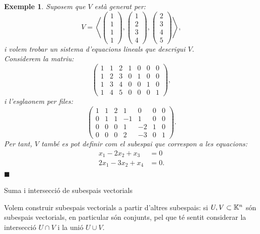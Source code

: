 \documentclass[
  11pt,
]{book}
\makeatletter
\numberwithin{dummy}{section}
\theoremstyle{maincolornumbox}
\theoremstyle{blacknumex}
\newtheorem{exampleT}{Exemple}[chapter]
\theoremstyle{blacknumbox}
\theoremstyle{maincolornum}
\newenvironment{example}{\begin{exampleT}}{\hfill{\tiny\ensuremath{\blacksquare}}\end{exampleT}}
\renewcommand{\section}{\@startsection{section}{1}{\z@}
{-4ex \@plus -1ex \@minus -.4ex}
{1ex \@plus.2ex }
{\normalfont\large\sffamily\bfseries}}
\newlength\esp
\makeatother
\begin{document}
\begin{example}
Suposem que \(V\) està generat per: \[V=\left\langle
    \begin{pmatrix}1 \\ 1 \\ 1 \\ 1  \end{pmatrix},
    \begin{pmatrix}1 \\ 2 \\ 3 \\ 4  \end{pmatrix},
    \begin{pmatrix}2 \\ 3 \\ 4 \\ 5  \end{pmatrix}\right\rangle,\] i
volem trobar un sistema d'equacions lineals que descrigui \(V\).\\
Considerem la matriu: \[\left(
    \begin{array}{ccc|cccc}
    1 & 1 & 2 & 1 & 0 & 0 & 0\\
    1 & 2 & 3 & 0 & 1 & 0 & 0\\
    1 & 3 & 4 & 0 & 0 & 1 & 0\\
    1 & 4 & 5 & 0 & 0 & 0 & 1
    \end{array}
    \right),\] i l'esglaonem per files: \[\left(
    \begin{array}{ccc|rrcc}
    1 & 1 & 2 & 1 & 0 & 0 & 0\\
    0 & 1 & 1 & -1 & 1 & 0 & 0\\ \hline
    0 & 0 & 0 & 1 & -2 & 1 & 0\\
    0 & 0 & 0 & 2 & -3 & 0 & 1
    \end{array}
    \right).\] Per tant, \(V\) també es pot definir com el subespai que
correspon a les equacions: \begin{align*}
    x_1-2x_2+x_3&=0\\ 2x_1-3x_2+x_4&=0.
\end{align*}
\end{example}

\section{Suma i intersecció de subespais vectorials}\label{suma-i-intersecciuxf3-de-subespais-vectorials}

Volem construir subespais vectorials a partir d'altres subespais: si
\(U,V\subset \mathbb{K}^n\) són subespais vectorials, en particular són conjunts,
pel que té sentit considerar la intersecció \(U\cap V\) i la unió
\(U\cup V\).
\end{document}
